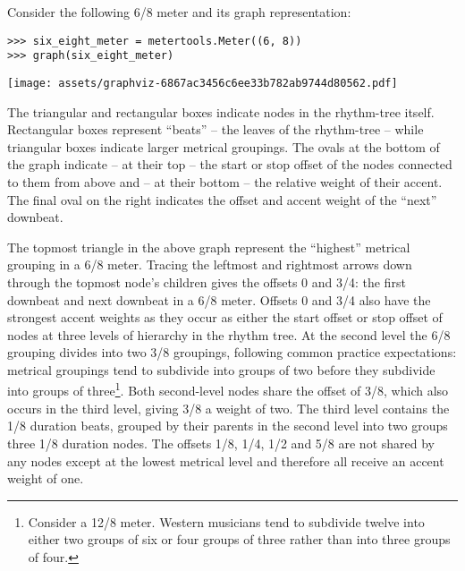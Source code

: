 Consider the following 6/8 meter and its graph representation:

\begin{comment}
<abjad>
six_eight_meter = metertools.Meter((6, 8))
graph(six_eight_meter)
</abjad>
\end{comment}

\begin{singlespacing}
\vspace{-0.5\baselineskip}
\begin{lstlisting}
>>> six_eight_meter = metertools.Meter((6, 8))
>>> graph(six_eight_meter)
\end{lstlisting}
\noindent\texttt{[image: assets/graphviz-6867ac3456c6ee33b782ab9744d80562.pdf]}
\end{singlespacing}

\noindent The triangular and rectangular boxes indicate nodes in the
rhythm-tree itself. Rectangular boxes represent \enquote{beats} -- the leaves
of the rhythm-tree -- while triangular boxes indicate larger metrical
groupings. The ovals at the bottom of the graph indicate -- at their top -- the
start or stop offset of the nodes connected to them from above and -- at their
bottom -- the relative weight of their accent. The final oval on the right
indicates the offset and accent weight of the \enquote{next} downbeat.

The topmost triangle in the above graph represent the \enquote{highest}
metrical grouping in a 6/8 meter. Tracing the leftmost and rightmost arrows
down through the topmost node's children gives the offsets 0 and 3/4: the first
downbeat and next downbeat in a 6/8 meter. Offsets 0 and 3/4 also have the
strongest accent weights as they occur as either the start offset or stop
offset of nodes at three levels of hierarchy in the rhythm tree. At the second
level the 6/8 grouping divides into two 3/8 groupings, following common
practice expectations: metrical groupings tend to subdivide into groups of two
before they subdivide into groups of three\footnote{Consider a 12/8 meter.
Western musicians tend to subdivide twelve into either two groups of six or
four groups of three rather than into three groups of four.}. Both second-level
nodes share the offset of 3/8, which also occurs in the third level, giving 3/8
a weight of two. The third level contains the 1/8 duration beats, grouped by
their parents in the second level into two groups three 1/8 duration nodes. The
offsets 1/8, 1/4, 1/2 and 5/8 are not shared by any nodes except at the lowest
metrical level and therefore all receive an accent weight of one.

